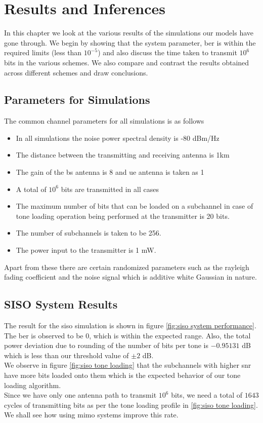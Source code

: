 \chapter{Results and Inferences}

In this chapter we look at the various results of the simulations our models have gone through. We begin by showing that the system parameter, \acrshort{ber} is within the required limits (less than $10^{-5}$) and also discuss the time taken to transmit $10^6$ bits in the various schemes. We also compare and contrast the results obtained across different schemes and draw conclusions.

\section{Parameters for Simulations}
The common channel parameters for all simulations is as follows
\begin{itemize}
\item In all simulations the noise power spectral density is -80 dBm/Hz
\item The distance between the transmitting and receiving antenna is 1km
\item The gain of the \acrshort{bs} antenna is 8 and \acrshort{ue} antenna is taken as 1
\item A total of $10^6$ bits are transmitted in all cases
\item The maximum number of bits that can be loaded on a subchannel in case of tone loading operation being performed at the transmitter is 20 bits.
\item The number of subchannels is taken to be 256.
\item The power input to the transmitter is 1 mW.
\end{itemize}

Apart from these there are certain randomized parameters such as the \gls{rayleigh fading} coefficient and the noise signal which is additive white Gaussian in nature.


\section{SISO System Results}
The result for the \acrshort{siso} simulation is shown in figure \ref{fig:siso system performance}. The \acrshort{ber} is observed to be $0$, which is within the expected range. Also, the total power deviation due to rounding of the number of bits per tone is $-0.95131$ dB which is less than our threshold value of $\pm 2$ dB.\\
We observe in figure \ref{fig:siso tone loading} that the subchannels with higher \acrshort{snr} have more bits loaded onto them which is the expected behavior of our tone loading algorithm.\\
Since we have only one antenna path to transmit $10^6$ bits, we need a total of $1643$ cycles of transmitting bits as per the tone loading profile in \ref{fig:siso tone loading}. We shall see how using \acrshort{mimo} systems improve this rate.

